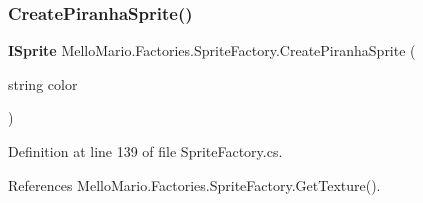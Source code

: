 \mbox{\label{classMelloMario_1_1Factories_1_1SpriteFactory_af8c46fbd5dbdb044a36f591e48ea96bb}} 
\subsubsection{Create\+Piranha\+Sprite()}
{\footnotesize\ttfamily \textbf{ I\+Sprite} Mello\+Mario.\+Factories.\+Sprite\+Factory.\+Create\+Piranha\+Sprite (\begin{DoxyParamCaption}\item[{string}]{color }\end{DoxyParamCaption})}



Definition at line 139 of file Sprite\+Factory.\+cs.



References Mello\+Mario.\+Factories.\+Sprite\+Factory.\+Get\+Texture().


